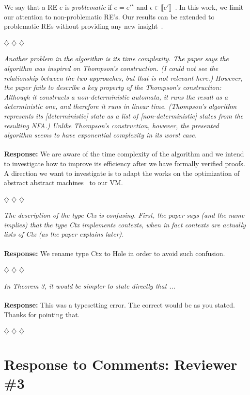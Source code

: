 \documentclass{article}
\newcommand{\separador}{\begin{center}
$\diamondsuit$ $\diamondsuit$ $\diamondsuit$
\end{center}}
\newcommand{\sembrackets}[1]{\ensuremath{\llbracket #1 \rrbracket}}
\begin{document}
We say that a RE $e$ is \emph{problematic}
if $e = e'^\star$ and $\epsilon \in \sembrackets{e'}$~\cite{Frisch2004}.
In this work, we limit our attention to non-problematic RE's. Our results
can be extended to problematic REs without providing any
new insight~\cite{Lasse2011,Frisch2004}.

\separador

\noindent\textit{Another problem in the algorithm is its time complexity. The paper says the algorithm was inspired on Thompson's construction.
(I could not see the relationship between the two approaches, but that is not relevant here.) However, the paper fails to describe a
key property of the Thompson's construction: Although it constructs a non-deterministic automata, it runs the result as a deterministic one,
and therefore it runs in linear time. (Thompson's algorithm represents its [deterministic] state as a list of [non-deterministic] states from
the resulting NFA.) Unlike Thompson's construction, however, the presented algorithm seems to have exponential complexity in its worst case.}
\\
\\
\noindent\textbf{Response:} We are aware of the time complexity of the algorithm and we intend to investigate how to improve its efficiency after we have formally verified proofs.
A direction we want to investigate is to adapt the works on the optimization of abstract abstract machines~\cite{Johnson2013} to our VM.

\separador

\noindent\textit{The description of the type Ctx is confusing. First, the paper says (and the name implies) that the type Ctx implements contexts, when in fact contexts are actually
lists of Ctx (as the paper explains later).}
\\
\\
\noindent\textbf{Response:} We rename type Ctx to Hole in order to avoid such confusion.

\separador

\noindent\textit{In Theorem 3, it would be simpler to state directly that ...}
\\
\\
\noindent\textbf{Response:} This was a typesetting error. The correct would be as you stated. Thanks for pointing that.

\separador

\section*{Response to Comments: Reviewer \#3}
\end{document}

